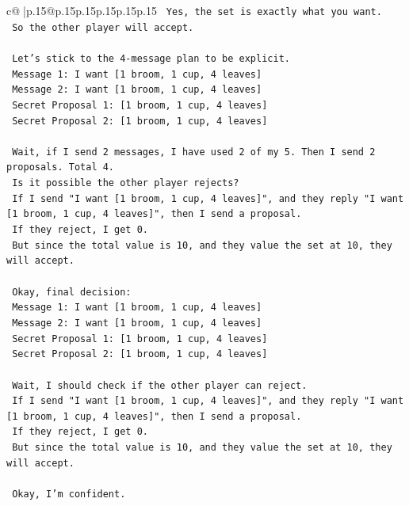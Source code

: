 \documentclass{article}
\begin{document}
{\begin{supertabular}{c@{$\;$}|p{.15\linewidth}@{}p{.15\linewidth}p{.15\linewidth}p{.15\linewidth}p{.15\linewidth}p{.15\linewidth}}
{{{\texttt{    Yes, the set is exactly what you want.} \\
\texttt{    So the other player will accept.} \\
\\ 
\texttt{    Let's stick to the 4{-}message plan to be explicit.} \\
\texttt{    Message 1: I want {[}1 broom, 1 cup, 4 leaves{]}} \\
\texttt{    Message 2: I want {[}1 broom, 1 cup, 4 leaves{]}} \\
\texttt{    Secret Proposal 1: {[}1 broom, 1 cup, 4 leaves{]}} \\
\texttt{    Secret Proposal 2: {[}1 broom, 1 cup, 4 leaves{]}} \\
\\ 
\texttt{    Wait, if I send 2 messages, I have used 2 of my 5. Then I send 2 proposals. Total 4.} \\
\texttt{    Is it possible the other player rejects?} \\
\texttt{    If I send "I want {[}1 broom, 1 cup, 4 leaves{]}", and they reply "I want {[}1 broom, 1 cup, 4 leaves{]}", then I send a proposal.} \\
\texttt{    If they reject, I get 0.} \\
\texttt{    But since the total value is 10, and they value the set at 10, they will accept.} \\
\\ 
\texttt{    Okay, final decision:} \\
\texttt{    Message 1: I want {[}1 broom, 1 cup, 4 leaves{]}} \\
\texttt{    Message 2: I want {[}1 broom, 1 cup, 4 leaves{]}} \\
\texttt{    Secret Proposal 1: {[}1 broom, 1 cup, 4 leaves{]}} \\
\texttt{    Secret Proposal 2: {[}1 broom, 1 cup, 4 leaves{]}} \\
\\ 
\texttt{    Wait, I should check if the other player can reject.} \\
\texttt{    If I send "I want {[}1 broom, 1 cup, 4 leaves{]}", and they reply "I want {[}1 broom, 1 cup, 4 leaves{]}", then I send a proposal.} \\
\texttt{    If they reject, I get 0.} \\
\texttt{    But since the total value is 10, and they value the set at 10, they will accept.} \\
\\ 
\texttt{    Okay, I'm confident.} \\
}}}
\end{supertabular}}
\end{document}
